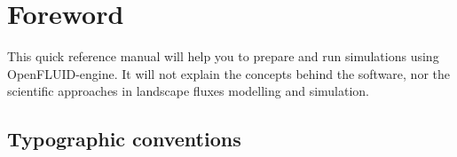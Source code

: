 \chapter*{Foreword}

This quick reference manual will help you to prepare and run simulations using
OpenFLUID-engine. It will not explain the concepts behind the software, nor the
scientific approaches in landscape fluxes modelling and simulation. 

\section*{Typographic conventions}




